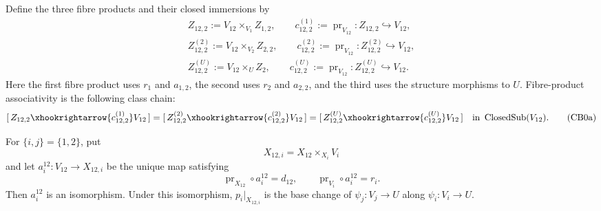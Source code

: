 \begin{definition}
  \label{def:nagata-two-open-comparison-boundary}

  Define the three fibre products and their closed immersions by
  \[
  \begin{gathered}
    Z_{12,2}:=V_{12}\times_{V_1}Z_{1,2},
    \qquad
    c_{12,2}^{(1)}:=\operatorname{pr}_{V_{12}}\colon
      Z_{12,2}\hookrightarrow V_{12},\\
    Z_{12,2}^{(2)}:=V_{12}\times_{V_2}Z_{2,2},
    \qquad
    c_{12,2}^{(2)}:=\operatorname{pr}_{V_{12}}\colon
      Z_{12,2}^{(2)}\hookrightarrow V_{12},\\
    Z_{12,2}^{(U)}:=V_{12}\times_UZ_2,
    \qquad
    c_{12,2}^{(U)}:=\operatorname{pr}_{V_{12}}\colon
      Z_{12,2}^{(U)}\hookrightarrow V_{12}.
  \end{gathered}
  \]
  Here the first fibre product uses $r_1$ and $a_{1,2}$, the second uses
  $r_2$ and $a_{2,2}$, and the third uses the structure morphisms to $U$.
  Fibre-product associativity is the following class chain:
  \[
    [\,Z_{12,2}\xhookrightarrow{c_{12,2}^{(1)}}V_{12}\,]
      =[\,Z_{12,2}^{(2)}\xhookrightarrow{c_{12,2}^{(2)}}V_{12}\,]
      =[\,Z_{12,2}^{(U)}\xhookrightarrow{c_{12,2}^{(U)}}V_{12}\,]
      \quad\text{in }\operatorname{ClosedSub}(V_{12}).          \tag{CB0a}
  \]
\end{definition}

\begin{lemma}
  \label{lemma:nagata-comparison-restrict-proper-open}

  For $\{i,j\}=\{1,2\}$, put
  \[
    X_{12,i}=X_{12}\times_{X_i}V_i
  \]
  and let $a_i^{12}\colon V_{12}\to X_{12,i}$ be the unique map satisfying
  \[
    \operatorname{pr}_{X_{12}}\circ a_i^{12}=d_{12},\qquad
    \operatorname{pr}_{V_i}\circ a_i^{12}=r_i.
  \]
  Then $a_i^{12}$ is an isomorphism.  Under this isomorphism,
  $p_i|_{X_{12,i}}$ is the base change of
  $\psi_j\colon V_j\to U$ along $\psi_i\colon V_i\to U$.
\end{lemma}

